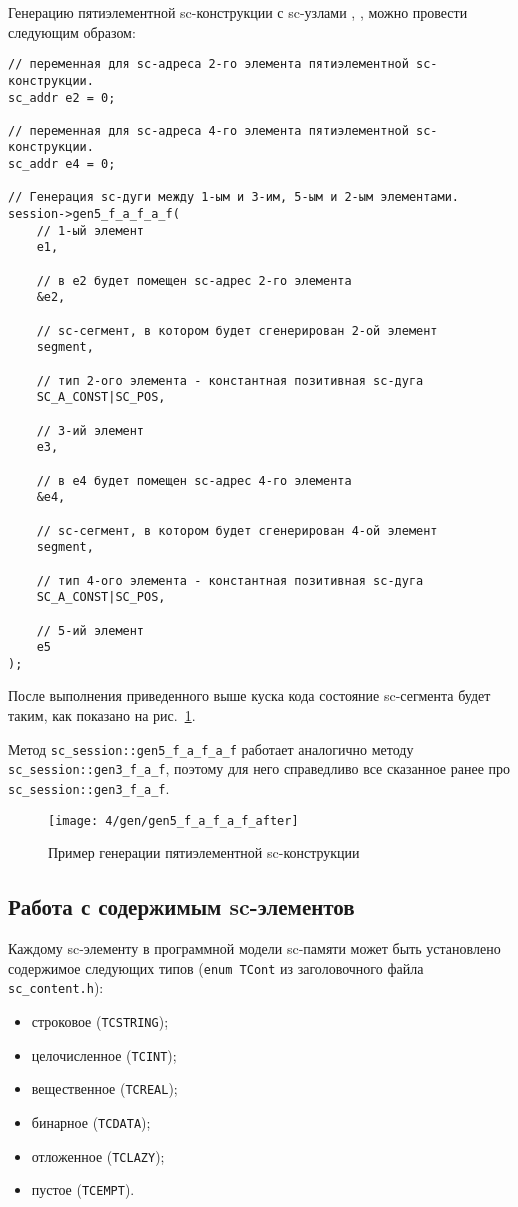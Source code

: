 Генерацию пятиэлементной sc-конструкции с sc-узлами ,
,  можно провести следующим образом:

\begin{lstlisting}[texcl]
// переменная для sc-адреса 2-го элемента пятиэлементной sc-конструкции.
sc_addr e2 = 0;

// переменная для sc-адреса 4-го элемента пятиэлементной sc-конструкции.
sc_addr e4 = 0;

// Генерация sc-дуги между 1-ым и 3-им, 5-ым и 2-ым элементами.
session->gen5_f_a_f_a_f(
    // 1-ый элемент
    e1,

    // в e2 будет помещен sc-адрес 2-го элемента
    &e2,

    // sc-сегмент, в котором будет сгенерирован 2-ой элемент
    segment,

    // тип 2-ого элемента - константная позитивная sc-дуга
    SC_A_CONST|SC_POS,

    // 3-ий элемент
    e3,

    // в e4 будет помещен sc-адрес 4-го элемента
    &e4,

    // sc-сегмент, в котором будет сгенерирован 4-ой элемент
    segment,

    // тип 4-ого элемента - константная позитивная sc-дуга
    SC_A_CONST|SC_POS,

    // 5-ий элемент
    e5
);
\end{lstlisting}

После выполнения приведенного выше куска кода состояние sc-сегмента
будет таким, как показано на рис.~\ref{fig:gen5_f_a_f_a_f_after}.

Метод \lstinline|sc_session::gen5_f_a_f_a_f| работает аналогично
методу \lstinline|sc_session::gen3_f_a_f|, поэтому для него
справедливо все сказанное ранее про
\lstinline|sc_session::gen3_f_a_f|.

\begin{figure}
  \centering
  \texttt{[image: 4/gen/gen5\_f\_a\_f\_a\_f\_after]}
  \caption{Пример генерации пятиэлементной sc-конструкции}
  \label{fig:gen5_f_a_f_a_f_after}
\end{figure}

\subsection{Работа с содержимым sc-элементов}
\label{sec:libsc_content}

Каждому sc-элементу в программной модели sc-памяти может быть
установлено содержимое следующих типов (\lstinline|enum TCont| из
заголовочного файла \verb|sc_content.h|):
\begin{itemize}
\item строковое (\lstinline|TCSTRING|);
\item целочисленное (\lstinline|TCINT|);
\item вещественное (\lstinline|TCREAL|);
\item бинарное (\lstinline|TCDATA|);
\item отложенное (\lstinline|TCLAZY|);
\item пустое (\lstinline|TCEMPT|).
\end{itemize}

